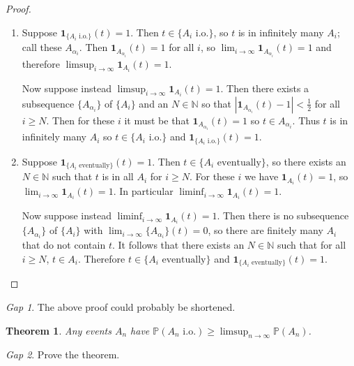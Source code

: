 \documentclass[11pt]{article}
\newcommand{\p}{\mathbb{P}}
\newcommand{\charf}[1]{\mathbf{1}_{#1}}
\newcommand{\NN}{\mathbb{N}}
\theoremstyle{theorem}
\newtheorem{theorem}{Theorem}[section]
\theoremstyle{definition}
\theoremstyle{remark}
\theoremstyle{step}
\theoremstyle{gap}
\newtheorem*{gap}{Gap}
\begin{document}
\begin{proof}\ 
\begin{enumerate}
\item
Suppose \(\charf{\{A_i \text{ i.o.}\}}(t) = 1\). Then \(t \in \{A_i \text{ i.o.}\}\), so \(t\) is in infinitely many \(A_i\); call these \(A_{\alpha_i}\). Then \(\charf{A_{\alpha_i}}(t) = 1\) for all \(i\), so \(\lim_{i \to \infty} \charf{A_{\alpha_i}}(t) = 1\) and therefore \(\limsup_{i \to \infty} \charf{A_{i}}(t) = 1\).

Now suppose instead \(\limsup_{i \to \infty} \charf{A_{i}}(t) = 1\). Then there exists a subsequence \(\{A_{\alpha_i}\}\) of \(\{A_i\}\) and an \(N \in \NN\) so that \(\left|\charf{A_{\alpha_i}}(t) - 1 \right| < \frac{1}{2}\) for all \(i \geq N\). Then for these \(i\) it must be that  \(\charf{A_{\alpha_i}}(t) = 1\) so \(t \in A_{\alpha_i}\). Thus \(t\) is in infinitely many \(A_i\) so \(t \in \{A_i \text{ i.o.}\}\) and \(\charf{\{A_i \text{ i.o.}\}}(t) = 1\).

\item
Suppose \(\charf{\{A_i \text{ eventually}\}}(t) = 1\). Then \(t \in \{A_i \text{ eventually}\}\), so there exists an \(N \in \NN\) such that \(t\) is in all \(A_i\) for \(i \geq N\). For these \(i\) we have \(\charf{A_i}(t)=1\), so \(\lim_{i \to \infty} \charf{A_i}(t) = 1\). In particular \(\liminf_{i \to \infty} \charf{A_i}(t) = 1\).

Now suppose instead \(\liminf_{i \to \infty} \charf{A_i}(t) = 1\). Then there is no subsequence \(\{A_{\alpha_i}\}\) of \(\{A_i\}\) with \(\lim_{i \to \infty}\{A_{\alpha_i}\}(t) =0\), so there are finitely many \(A_i\) that do not contain \(t\). It follows that there exists an \(N \in \NN\) such that for all \(i \geq N\), \(t \in A_i\). Therefore \(t \in \{A_i \text{ eventually}\}\) and \(\charf{\{A_i \text{ eventually}\}}(t) = 1\).
\end{enumerate}
\end{proof}

\begin{gap}
The above proof could probably be shortened.
\end{gap}

\begin{theorem}
Any events \(A_n\) have \(\p(A_n \text{ i.o.}) \geq \limsup_{n\to\infty} \p(A_n)\).
\end{theorem}

\begin{gap}
Prove the theorem.
\end{gap}
\end{document}

